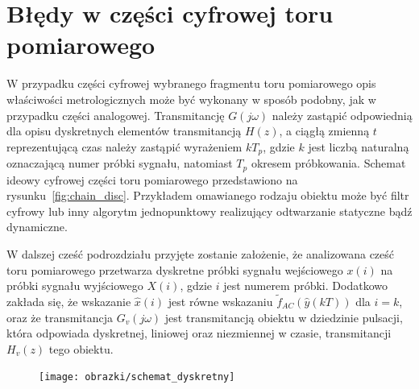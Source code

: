 \section{Błędy w części cyfrowej toru pomiarowego}

W przypadku części cyfrowej wybranego fragmentu toru pomiarowego opis właściwości metrologicznych może być wykonany w sposób podobny, jak w przypadku części analogowej. Transmitancję $G(j\omega)$ należy zastąpić odpowiednią dla opisu dyskretnych elementów transmitancją $H(z)$, a ciągłą zmienną $t$ reprezentującą czas należy zastąpić wyrażeniem $kT_{p}$, gdzie $k$ jest liczbą naturalną oznaczającą numer próbki sygnału, natomiast $T_{p}$ okresem próbkowania. Schemat ideowy cyfrowej części toru pomiarowego przedstawiono na rysunku~\ref{fig:chain_disc}. Przykładem omawianego rodzaju obiektu może być filtr cyfrowy lub inny algorytm jednopunktowy realizujący odtwarzanie statyczne bądź dynamiczne.

W dalszej cześć podrozdziału przyjęte zostanie założenie, że analizowana cześć toru pomiarowego przetwarza dyskretne próbki sygnału wejściowego $x(i)$ na próbki sygnału wyjściowego $X(i)$, gdzie $i$ jest numerem próbki. Dodatkowo zakłada się, że wskazanie $\hat{x}(i)$ jest równe wskazaniu $\tilde{f}_{AC}(\hat{y}(kT))$ dla $i = k$, oraz że transmitancja $G_{v}(j\omega)$ jest transmitancją obiektu w dziedzinie pulsacji, która odpowiada dyskretnej, liniowej oraz niezmiennej w czasie, transmitancji $H_{v}(z)$ tego obiektu.

\begin{figure}[htb!]
\begin{center}
\texttt{[image: obrazki/schemat\_dyskretny]}
\end{center}
\end{figure}

